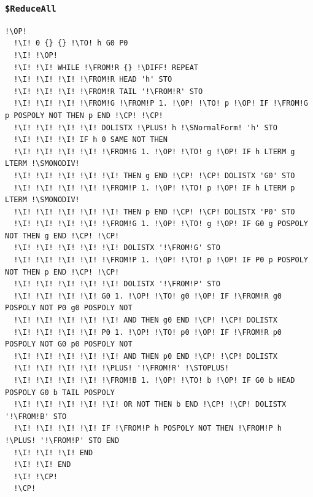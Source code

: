 \documentclass[12pt,a4paper]{report}
\newcommand{\kwd}[1]{\texttt{\textcolor{keyword}{#1}}}
\newcommand{\I}{\enspace\textcolor{indent}\vrule\hspace{2pt}}
\newcommand{\DIFF}{\kwd{$\neq$}} %
\newcommand{\PLUS}{\kwd{+}}   %
\newcommand{\STOPLUS}{\kwd{STO+}} %
\newcommand{\SMONODIV}{\kwd{\$MONODIV}}   %
\newcommand{\SReduceAll}{\kwd{\$ReduceAll}}   %
\newcommand{\SNormalForm}{\kwd{\$NormalForm}}   %
\newcommand{\OP}{\kwd{$\ll$}}   %
\newcommand{\CP}{\kwd{$\gg$}}   %
\newcommand{\TO}{\kwd{$\rightarrow$}} %
\newcommand{\FROM}{\kwd{$\leftarrow$}} %
\numberwithin{theorem}{chapter}
\begin{document}
\subsubsection{\SReduceAll}\label{SReduceAll}
\begin{lstlisting}[language=userrpl]
  !\OP!
  !\I! 0 {} {} !\TO! h G0 P0
  !\I! !\OP!
  !\I! !\I! WHILE !\FROM!R {} !\DIFF! REPEAT
  !\I! !\I! !\I! !\FROM!R HEAD 'h' STO
  !\I! !\I! !\I! !\FROM!R TAIL '!\FROM!R' STO
  !\I! !\I! !\I! !\FROM!G !\FROM!P 1. !\OP! !\TO! p !\OP! IF !\FROM!G p POSPOLY NOT THEN p END !\CP! !\CP!
  !\I! !\I! !\I! !\I! DOLISTX !\PLUS! h !\SNormalForm! 'h' STO
  !\I! !\I! !\I! IF h 0 SAME NOT THEN
  !\I! !\I! !\I! !\I! !\FROM!G 1. !\OP! !\TO! g !\OP! IF h LTERM g LTERM !\SMONODIV!
  !\I! !\I! !\I! !\I! !\I! THEN g END !\CP! !\CP! DOLISTX 'G0' STO
  !\I! !\I! !\I! !\I! !\FROM!P 1. !\OP! !\TO! p !\OP! IF h LTERM p LTERM !\SMONODIV!
  !\I! !\I! !\I! !\I! !\I! THEN p END !\CP! !\CP! DOLISTX 'P0' STO
  !\I! !\I! !\I! !\I! !\FROM!G 1. !\OP! !\TO! g !\OP! IF G0 g POSPOLY NOT THEN g END !\CP! !\CP!
  !\I! !\I! !\I! !\I! !\I! DOLISTX '!\FROM!G' STO
  !\I! !\I! !\I! !\I! !\FROM!P 1. !\OP! !\TO! p !\OP! IF P0 p POSPOLY NOT THEN p END !\CP! !\CP!
  !\I! !\I! !\I! !\I! !\I! DOLISTX '!\FROM!P' STO
  !\I! !\I! !\I! !\I! G0 1. !\OP! !\TO! g0 !\OP! IF !\FROM!R g0 POSPOLY NOT P0 g0 POSPOLY NOT
  !\I! !\I! !\I! !\I! !\I! AND THEN g0 END !\CP! !\CP! DOLISTX
  !\I! !\I! !\I! !\I! P0 1. !\OP! !\TO! p0 !\OP! IF !\FROM!R p0 POSPOLY NOT G0 p0 POSPOLY NOT
  !\I! !\I! !\I! !\I! !\I! AND THEN p0 END !\CP! !\CP! DOLISTX
  !\I! !\I! !\I! !\I! !\PLUS! '!\FROM!R' !\STOPLUS!
  !\I! !\I! !\I! !\I! !\FROM!B 1. !\OP! !\TO! b !\OP! IF G0 b HEAD POSPOLY G0 b TAIL POSPOLY
  !\I! !\I! !\I! !\I! !\I! OR NOT THEN b END !\CP! !\CP! DOLISTX '!\FROM!B' STO
  !\I! !\I! !\I! !\I! IF !\FROM!P h POSPOLY NOT THEN !\FROM!P h !\PLUS! '!\FROM!P' STO END
  !\I! !\I! !\I! END
  !\I! !\I! END
  !\I! !\CP!
  !\CP!
\end{lstlisting}
\end{document}
